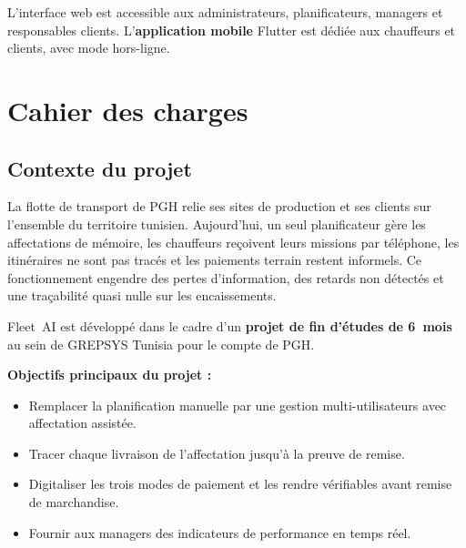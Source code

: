 L'interface web est accessible aux administrateurs, planificateurs, managers et responsables clients. L'\textbf{application mobile} Flutter est dédiée aux chauffeurs et clients, avec mode hors-ligne.

\section{Cahier des charges}

\subsection{Contexte du projet}
La flotte de transport de PGH relie ses sites de production et ses clients sur l'ensemble du territoire tunisien. Aujourd'hui, un seul planificateur gère les affectations de mémoire, les chauffeurs reçoivent leurs missions par téléphone, les itinéraires ne sont pas tracés et les paiements terrain restent informels. Ce fonctionnement engendre des pertes d'information, des retards non détectés et une traçabilité quasi nulle sur les encaissements.

Fleet~AI est développé dans le cadre d'un \textbf{projet de fin d'études de 6~mois} au sein de GREPSYS Tunisia pour le compte de PGH.

\textbf{Objectifs principaux du projet :}
\begin{itemize}
    \item[$\bullet$] Remplacer la planification manuelle par une gestion multi-utilisateurs avec affectation assistée.
    \item[$\bullet$] Tracer chaque livraison de l'affectation jusqu'à la preuve de remise.
    \item[$\bullet$] Digitaliser les trois modes de paiement et les rendre vérifiables avant remise de marchandise.
    \item[$\bullet$] Fournir aux managers des indicateurs de performance en temps réel.
\end{itemize}

